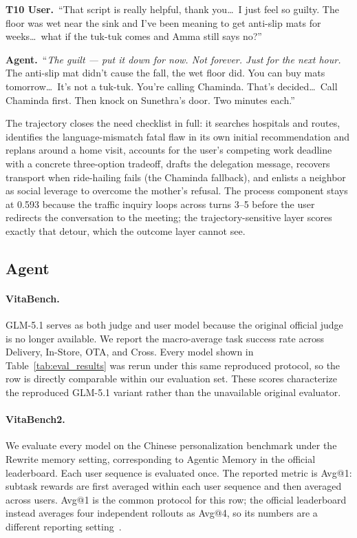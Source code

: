 \begin{tcolorbox}[breakable,arc=3pt,boxrule=0.4pt,colback=mindlabbg,colframe=mindlabline,left=6pt,right=6pt,top=5pt,bottom=5pt,before skip=6pt,after skip=6pt]
{\color{mindlabmuted}\textbf{T10 \textbar{} User.}\ ``That script is really helpful, thank you\ldots\ I just feel so guilty. The floor was wet near the sink and I've been meaning to get anti-slip mats for weeks\ldots\ what if the tuk-tuk comes and Amma still says no?''}\par\smallskip
{\color{mindlabink}\textbf{Agent.}\ ``\emph{The guilt --- put it down for now. Not forever. Just for the next hour.} The anti-slip mat didn't cause the fall, the wet floor did. You can buy mats tomorrow\ldots\ It's not a tuk-tuk. You're calling Chaminda. That's decided\ldots\ Call Chaminda first. Then knock on Sunethra's door. Two minutes each.''}
\end{tcolorbox}

\noindent The trajectory closes the need checklist in full: it searches hospitals and routes, identifies the language-mismatch fatal flaw in its own initial recommendation and replans around a home visit, accounts for the user's competing work deadline with a concrete three-option tradeoff, drafts the delegation message, recovers transport when ride-hailing fails (the Chaminda fallback), and enlists a neighbor as social leverage to overcome the mother's refusal. The process component stays at 0.593 because the traffic inquiry loops across turns 3--5 before the user redirects the conversation to the meeting; the trajectory-sensitive layer scores exactly that detour, which the outcome layer cannot see.

\subsection{Agent}

\paragraph{VitaBench.} GLM-5.1 serves as both judge and user model because the original official judge is no longer available. We report the macro-average task success rate across Delivery, In-Store, OTA, and Cross. Every model shown in Table~\ref{tab:eval_results} was rerun under this same reproduced protocol, so the row is directly comparable within our evaluation set. These scores characterize the reproduced GLM-5.1 variant rather than the unavailable original evaluator.

\paragraph{VitaBench2.} We evaluate every model on the Chinese personalization benchmark under the Rewrite memory setting, corresponding to Agentic Memory in the official leaderboard. Each user sequence is evaluated once. The reported metric is Avg@1: subtask rewards are first averaged within each user sequence and then averaged across users. Avg@1 is the common protocol for this row; the official leaderboard instead averages four independent rollouts as Avg@4, so its numbers are a different reporting setting~\citep{chen2026vitabench2}.

